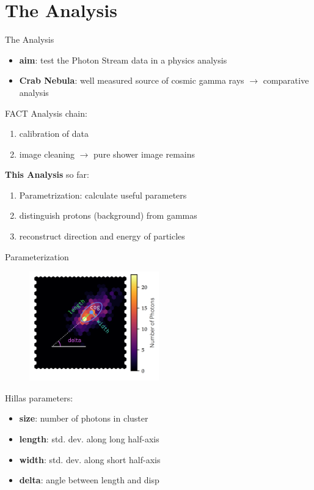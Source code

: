\section{The Analysis}

\begin{frame}[t]{The Analysis}
    \begin{itemize}
        \item \textbf{{\color{tugreen} aim}}: test the Photon Stream data in a physics analysis
        \item \textbf{{\color{tugreen} Crab Nebula}}: well measured source of cosmic gamma rays $\rightarrow$ comparative analysis 
    \end{itemize}
FACT Analysis chain:
    \begin{enumerate}
        \item calibration of data
        \item image cleaning $\rightarrow$ pure shower image remains
    \end{enumerate}
\textbf{{\color{tugreen} This Analysis}} so far:
    \begin{enumerate}\addtocounter{enumi}{2}
        \item Parametrization: calculate useful parameters
        \item distinguish protons (background) from gammas
        \item reconstruct direction and energy of particles
    \end{enumerate}
\end{frame}

\begin{frame}[t]{Parameterization}
    \begin{multicols}{2}
        \begin{figure}
            \centering
            \includegraphics[width=0.5\textwidth]{fig/hillas.png}
        \end{figure}
    \columnbreak
Hillas parameters:
    \begin{itemize}
        \item \textbf{{\color{tugreen} size}}: number of photons in cluster
        \item \textbf{{\color{tugreen} length}}: std. dev. along long half-axis
        \item \textbf{{\color{tugreen} width}}: std. dev. along short half-axis
        \item \textbf{{\color{tugreen} delta}}: angle between length and disp
    \end{itemize}
    \end{multicols}
\end{frame}

